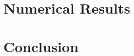 \documentclass{article}
\begin{document}




\section{Numerical Results}
\label{sec:numerical}
 
 
 

\section{Conclusion}
\label{sec:conclusion}




\vfill\pagebreak



\end{document}
